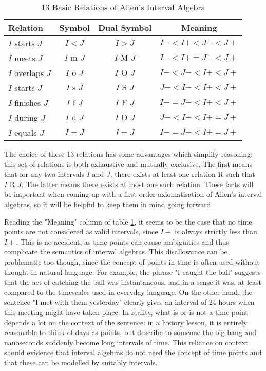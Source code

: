 \begin{table}[htpb]
  \centering
  \begin{tabular}{|l|c|c|c|}
    \hline
    Relation & Symbol & Dual Symbol & Meaning \\
    \hline
    \(I\) starts \(J\)
             & \(I < J\)
             & \(I > J\)
             & \(I- < I+ < J- < J+\)\\
    \(I\) meets \(J\)
             & \(I\text{ m }J\)
             & \(I\text{ M }J\)
             & \(I- < I+ = J - < J+\)\\
    \(I\) overlaps \(J\)
             & \(I\text{ o }J\)
             & \(I\text{ O }J\)
             & \(I- < J- < I+ < J+\)\\
    \(I\) starts \(J\)
             & \(I\text{ s }J\)
             & \(I\text{ S }J\)
             & \(J- < I- < I+ < J+\)\\
    \(I\) finishes \(J\)
             & \(I\text{ f }J\)
             & \(I\text{ F }J\)
             & \(I- = J- < I+ < J+\)\\
    \(I\) during \(J\)
             & \(I\text{ d }J\)
             & \(I\text{ D }J\)
             & \(J- < I- < I+ = J+\)\\
    \(I\) equals \(J\)
             & \(I = J\)
             & \(I = J\)
             & \(I- = J- < I+ = J+\)\\
    \hline
  \end{tabular}
  \caption{13 Basic Relations of Allen's Interval Algebra}
  \label{tab:basic_relations}
\end{table}

The choice of these 13 relations has some advantages which simplify reasoning: this set of
relations is both exhaustive and mutually-exclusive. The first means that for any two intervals
$I$ and $J$, there exists at least one relation R  such that $I\text{ R }J$. The latter
means there exists at most one such relation. These facts will be important when coming up
with a first-order axiomatisation of Allen's interval algebras, so it will be helpful to keep them
in mind going forward.

Reading the "Meaning" column of table \ref{tab:basic_relations}, it seems to be the case that
no time points are not considered as valid intervals, since $I-$ is always strictly less than
$I+$. This is no accident, as time points can cause ambiguities and thus complicate the
semantics of interval algebras. This disallowance can be problematic too though, since the
concept of points in time is often used without thought in natural language. For example, the
phrase "I caught the ball" suggests that the act of catching the ball was instantaneous, and in a
sense it was, at least compared to the timescales used in everyday language. On the other hand,
the sentence "I met with them yesterday" clearly gives an interval of 24 hours when this meeting
might have taken place. In reality, what is or is not a time point depends a lot on the
context of the sentence: in a history lesson, it is entirely reasonable to think of days as
points, but describe to someone the big bang and nanoseconds suddenly become long intervals of
time. This reliance on context should evidence that interval algebras do not need the concept
of time points and that these can be modelled by suitably intervals.

